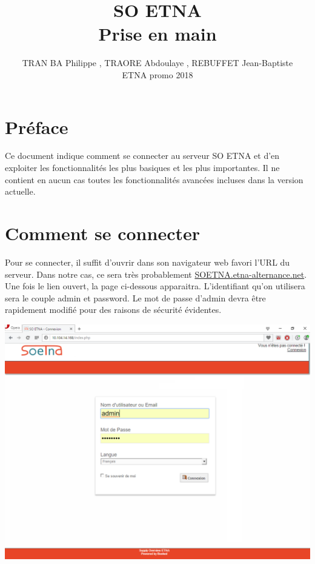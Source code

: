 \documentclass[a4paper,11pt]{article}
\title{SO ETNA \\ Prise en main}
\author{TRAN BA Philippe , TRAORE Abdoulaye , REBUFFET Jean-Baptiste \\ ETNA promo 2018}
\begin{document}
\pagestyle{fancy}
\date{}
\chead{}
\rhead{}
\cfoot{}
\renewcommand{\headrulewidth}{0.4pt}
\renewcommand{\footrulewidth}{0.4pt}

\maketitle
\tableofcontents

\vspace{2 cm}

\section*{Préface}

Ce document indique comment se connecter au serveur SO ETNA et d'en exploiter les fonctionnalités les plus basiques
et les plus importantes. Il ne contient en aucun cas toutes les fonctionnalités avancées incluses dans la version actuelle.

\newpage

\section{Comment se connecter}

Pour se connecter, il suffit d'ouvrir dans son navigateur web favori l'URL du serveur. Dans notre cas, ce sera très probablement
\url{SOETNA.etna-alternance.net}. Une fois le lien ouvert, la page ci-dessous apparaitra. L'identifiant qu'on utilisera
sera le couple admin et password. Le mot de passe d'admin devra être rapidement modifié pour des raisons de sécurité évidentes.

\vspace{1 cm}

\includegraphics[width=15cm]{./login.PNG}
\end{document}
